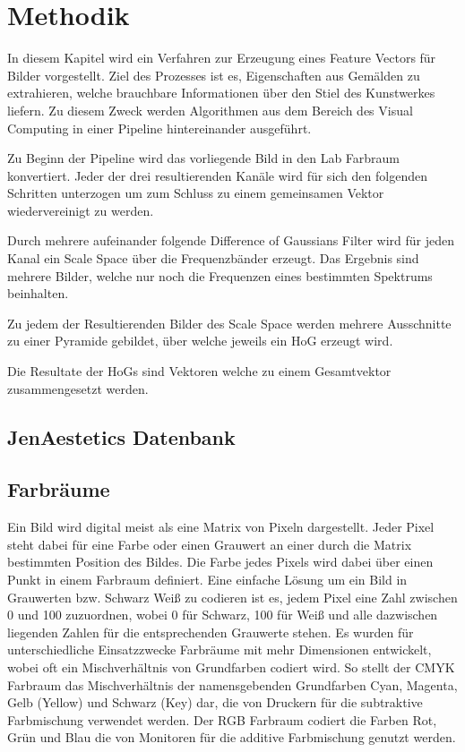 \chapter{Methodik}

In diesem Kapitel wird ein Verfahren zur Erzeugung eines Feature Vectors für Bilder vorgestellt. Ziel des Prozesses ist es, Eigenschaften aus Gemälden zu extrahieren, welche brauchbare Informationen über den Stiel des Kunstwerkes liefern. Zu diesem Zweck werden Algorithmen aus dem Bereich des Visual Computing in einer Pipeline hintereinander ausgeführt.

Zu Beginn der Pipeline wird das vorliegende Bild in den Lab Farbraum konvertiert. Jeder der drei resultierenden Kanäle wird für sich den folgenden Schritten unterzogen um zum Schluss zu einem gemeinsamen Vektor wiedervereinigt zu werden.

Durch mehrere aufeinander folgende Difference of Gaussians Filter wird für jeden Kanal ein Scale Space über die Frequenzbänder erzeugt. Das Ergebnis sind mehrere Bilder, welche nur noch die Frequenzen eines bestimmten Spektrums beinhalten.

Zu jedem der Resultierenden Bilder des Scale Space werden mehrere Ausschnitte zu einer Pyramide gebildet, über welche jeweils ein \ac{HoG} erzeugt wird. 

Die Resultate der \ac{HoG}s sind Vektoren welche zu einem Gesamtvektor zusammengesetzt werden.

\section{JenAestetics Datenbank}

\blindtext

\section{Farbräume}

Ein Bild wird digital meist als eine Matrix von Pixeln dargestellt. Jeder Pixel steht dabei für eine Farbe oder einen Grauwert an einer durch die Matrix bestimmten Position des Bildes. Die Farbe jedes Pixels wird dabei über einen Punkt in einem Farbraum definiert.
Eine einfache Lösung um ein Bild in Grauwerten bzw. Schwarz Weiß zu codieren ist es, jedem Pixel eine Zahl zwischen 0 und 100 zuzuordnen, wobei 0 für Schwarz, 100 für Weiß und alle dazwischen liegenden Zahlen für die entsprechenden Grauwerte stehen.
Es wurden für unterschiedliche Einsatzzwecke Farbräume mit mehr Dimensionen entwickelt, wobei oft ein Mischverhältnis von Grundfarben codiert wird. So stellt der CMYK Farbraum das Mischverhältnis der namensgebenden Grundfarben Cyan, Magenta, Gelb (Yellow) und Schwarz (Key) dar, die von Druckern für die subtraktive Farbmischung verwendet werden.
Der RGB Farbraum codiert die Farben Rot, Grün und Blau die von Monitoren für die additive Farbmischung genutzt werden.

